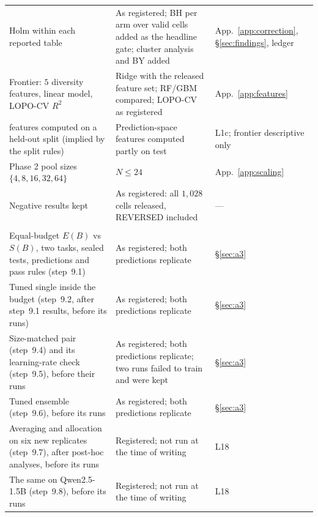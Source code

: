 \documentclass[11pt]{article}
\begin{document}
\begin{table}[t]
\begin{tabular}{@{}>{\raggedright\arraybackslash}p{}>{\raggedright\arraybackslash}p{}>{\raggedright\arraybackslash}p{}@{}}
Holm within each reported table & As registered; BH per arm over valid cells added as the headline gate; cluster analysis and BY added & App.~\ref{app:correction}, \S\ref{sec:findings}, ledger \\
Frontier: $5$ diversity features, linear model, LOPO-CV $R^2$ & Ridge with the released feature set; RF/GBM compared; LOPO-CV as registered & App.~\ref{app:features} \\
\quad features computed on a held-out split (implied by the split rules) & Prediction-space features computed partly on test & L1c; frontier descriptive only \\
Phase 2 pool sizes $\{4,8,16,32,64\}$ & $N\leq24$ & App.~\ref{app:scaling} \\
Negative results kept & As registered: all $1{,}028$ cells released, REVERSED included & --- \\
\midrule
\multicolumn{3}{@{}l}{\emph{Second registration} (\texttt{mechanism/\allowbreak PREREG\_AB.md}, before its runs)} \\
Equal-budget $E(B)$ vs $S(B)$, two tasks, sealed tests, predictions and pass rules (step~9.1) & As registered; both predictions replicate & \S\ref{sec:a3} \\
Tuned single inside the budget (step~9.2, after step~9.1 results, before its runs) & As registered; both predictions replicate & \S\ref{sec:a3} \\
Size-matched pair (step~9.4) and its learning-rate check (step~9.5), before their runs & As registered; both predictions replicate; two runs failed to train and were kept & \S\ref{sec:a3} \\
Tuned ensemble (step~9.6), before its runs & As registered; both predictions replicate & \S\ref{sec:a3} \\
Averaging and allocation on six new replicates (step~9.7), after post-hoc analyses, before its runs & Registered; not run at the time of writing & L18 \\
The same on Qwen2.5-1.5B (step~9.8), before its runs & Registered; not run at the time of writing & L18 \\
\bottomrule
\end{tabular}
\end{table}
\end{document}
